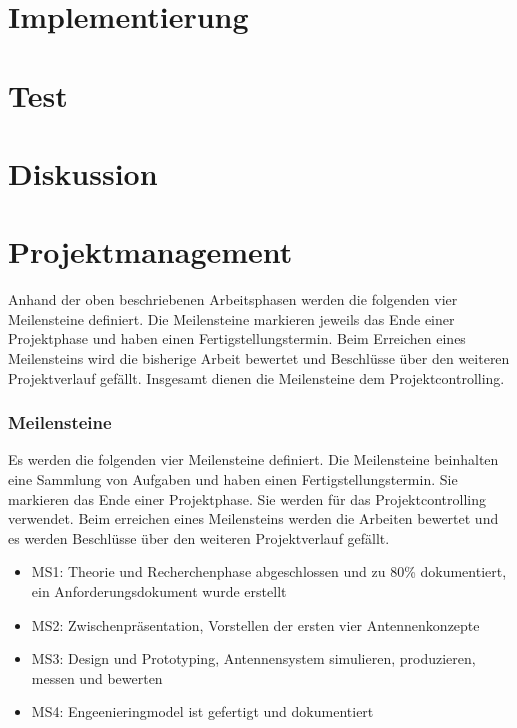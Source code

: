 \newpage
\section{Implementierung}
\section{Test}
\section{Diskussion}
\section{Projektmanagement}
Anhand der oben beschriebenen Arbeitsphasen werden die folgenden vier Meilensteine definiert. Die Meilensteine markieren jeweils das Ende einer Projektphase und haben einen Fertigstellungstermin. Beim Erreichen eines Meilensteins wird die bisherige Arbeit bewertet und Beschlüsse über den weiteren Projektverlauf gefällt. Insgesamt dienen die Meilensteine dem Projektcontrolling.
\subsubsection{Meilensteine}
Es werden die folgenden vier Meilensteine definiert. Die Meilensteine
beinhalten   eine Sammlung von Aufgaben und haben einen
Fertigstellungstermin. Sie markieren das Ende einer Projektphase. Sie
werden für das Projektcontrolling verwendet. Beim erreichen eines Meilensteins werden die Arbeiten bewertet und es werden Beschlüsse über den weiteren Projektverlauf gefällt.
	\begin{itemize}
		\item MS1: Theorie und Recherchenphase abgeschlossen und zu 80\% dokumentiert, ein Anforderungsdokument wurde erstellt
		\item MS2: Zwischenpräsentation, Vorstellen der ersten vier Antennenkonzepte
		\item MS3: Design und Prototyping, Antennensystem simulieren, produzieren, messen und bewerten
		\item MS4: Engeenieringmodel ist gefertigt und dokumentiert
	\end{itemize}

\newpage
\begin{thebibliography}{mustermarke}
\end{thebibliography}
